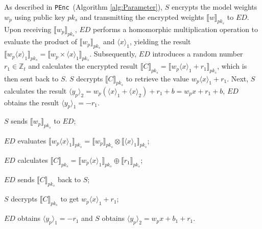 ﻿\documentclass[conference]{IEEEtran}
\newcommand{\PEnc}{\texttt{PEnc}}
\begin{document}
As described in \PEnc~(Algorithm \ref{alg:Parameter}), $S$ encrypts the model weights $w_p$ using public key $pk_s$ and transmitting the encrypted weights $\llbracket w \rrbracket_{pk_s}$ to $ED$. Upon receiving $\llbracket w_p \rrbracket_{pk_s}$, $ED$ performs a homomorphic multiplication operation to evaluate the product of $\llbracket w_p \rrbracket_{pk_s}$ and $\langle x \rangle_1$, yielding the result $\llbracket w_p \langle x \rangle_1\rrbracket_{pk_s} = \llbracket w_p \times \langle x \rangle_1 \rrbracket_{pk_s}$. Subsequently, $ED$ introduces a random number $r_1\in \mathbb{Z}_t$ and calculates the encrypted result $\llbracket C \rrbracket_{pk_s}=\llbracket w_p \langle x \rangle_1 + r_1 \rrbracket_{pk_s}$, which is then sent back to $S$. $S$ decrypts $\llbracket C \rrbracket_{pk_s}$ to retrieve the value $w_p\langle x \rangle_1+r_1$. Next, $S$ calculates the result $\langle y_p\rangle_2= w_p(\langle x \rangle_1 + \langle x \rangle_2)+r_1+b=w_px+r_1+b$, $ED$ obtains the result $\langle y_p\rangle_1=-r_1$. 
\begin{algorithm}[htbp]
	\caption{\PEnc($\langle x \rangle_1,\langle x \rangle_2,w,b) \rightarrow (\langle y_p\rangle_1, \langle y_p\rangle_2$)}
    \label{alg:Parameter}
    \LinesNumbered
     $S$ sends $\llbracket w_p\rrbracket_{pk_s}$ to $ED$;

     $ED$ evaluates $\llbracket w_p\langle x \rangle_1 \rrbracket_{pk_s} = \llbracket w_p \rrbracket_{pk_s} \otimes \llbracket \langle x \rangle_1 \rrbracket_{pk_s}$;

     $ED$  calculates $\llbracket C\rrbracket_{pk_s} = \llbracket w_p\langle x \rangle_1 \rrbracket_{pk_s} \oplus \llbracket r_1 \rrbracket_{pk_s}$;

     $ED$ sends $\llbracket C\rrbracket_{pk_s}$ back to $S$;

     $S$ decrypts $\llbracket C\rrbracket_{pk_s}$ to get $w_p\langle x \rangle_1 + r_1$;

     $ED$ obtains $\langle y_p\rangle_1=-r_1$ and $S$ obtains $\langle y_p\rangle_2 = w_p x  + b_1 + r_1$.
\end{algorithm}
\end{document}
